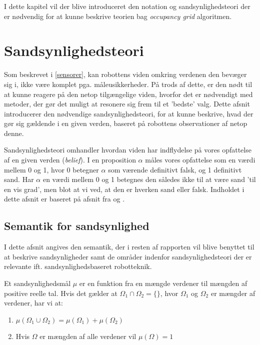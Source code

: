 I dette kapitel vil der blive introduceret den notation og sandsynlighedsteori der er nødvendig for at kunne beskrive teorien bag \textit{occupancy grid} algoritmen.



\section{Sandsynlighedsteori}
Som beskrevet i \cref{sensorer}, kan robottens viden omkring verdenen den bevæger sig i, ikke være komplet pga. måleusikkerheder.
På trods af dette, er den nødt til at kunne reagere på den netop tilgængelige viden, hvorfor det er nødvendigt med metoder, der gør det muligt at resonere sig frem til et 'bedste' valg.
Dette afsnit introducerer den nødvendige sandsynlighedsteori, for at kunne beskrive, hvad der gør sig gældende i en given verden, baseret på robottens observationer af netop denne.

Sandsynlighedsteori omhandler hvordan viden har indflydelse på vores opfattelse af en given verden (\textit{belief}).
I en proposition $\alpha$ måles vores opfattelse som en værdi mellem 0 og 1, hvor 0 betegner $\alpha$ som værende definitivt falsk, og 1 definitivt sand.
Har $\alpha$ en værdi mellem 0 og 1 betegnes den således ikke til at være sand 'til en vis grad', men blot at vi ved, at den er hverken sand eller falsk.
Indholdet i dette afsnit er baseret på afsnit fra \cite{ArtificialIntelligence} og \cite{probabilisticRobotics}.

\subsection{Semantik for sandsynlighed}
I dette afsnit angives den semantik, der i resten af rapporten vil blive benyttet til at beskrive sandsynligheder 
samt de områder indenfor sandsynlighedsteori der er relevante ift. sandsynlighedsbaseret robotteknik.

Et sandsynlighedsmål $\mu$ er en funktion fra en mængde verdener til mængden af positive reelle tal. 
Hvis det gælder at $\Omega_1 \cap \Omega_2 = \{{}\}$, hvor $\Omega_1$ og $\Omega_2$ er mængder af verdener, har vi at:

\begin{enumerate}
\item $\mu(\Omega_1 \cup \Omega_2) = \mu(\Omega_1) + \mu(\Omega_2)$
\item Hvis $\Omega$ er mængden af alle verdener vil $\mu(\Omega) = 1$ 
\end{enumerate}

